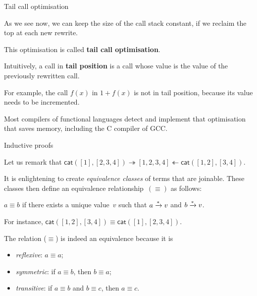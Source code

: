 \documentclass[compress,dvipdfmx]{beamer}
\newcommand\Clang{\textsf{C}\xspace}
\newcommand\fun[1]{\textsf{#1}}
\begin{document}
%
\begin{frame}{Tail call optimisation}

  As we see now, we can keep the size of the call stack constant, if
  we reclaim the top at each new rewrite.

  \bigskip

  This optimisation is called \textbf{tail call optimisation}.

  \bigskip

  Intuitively, a call in \textbf{tail position} is a call whose value
  is the value of the previously rewritten call.

  \bigskip

  For example, the call \(f(x)\) in \(1 + f(x)\) is not in tail
  position, because its value needs to be incremented.

  \bigskip

  Most compilers of functional languages detect and implement that
  optimisation that saves memory, including the \Clang compiler of
  \textsf{GCC}.

\end{frame}

%
\begin{frame}{Inductive proofs}

Let us remark that \(\fun{cat}([1], [2,3,4]) \twoheadrightarrow
[1,2,3,4] \twoheadleftarrow \fun{cat}([1,2],
[3,4])\).

\bigskip

It is enlightening to create \emph{equivalence classes} of terms that
are joinable. These classes then define an equivalence
relationship~\((\equiv)\) as follows:
\begin{center}
  \(a \equiv b\) if there exists a unique value~\(v\) such that \(a
  \xrightarrow{\smash[t]{*}} v\) and \(b \xrightarrow{\smash{*}} v\).
\end{center}
For instance, \(\fun{cat}([1,2], [3,4]) \equiv \fun{cat}([1],
[2,3,4])\).

\bigskip

The relation (\(\equiv\)) is indeed an equivalence because it is
\begin{itemize}

  \item \emph{reflexive}: \(a \equiv a\);

  \item \emph{symmetric}: if \(a \equiv b\), then \(b \equiv a\);

  \item \emph{transitive}: if \(a \equiv b\) and \(b \equiv c\), then
    \(a \equiv c\).

\end{itemize}

\end{frame}
\end{document}
